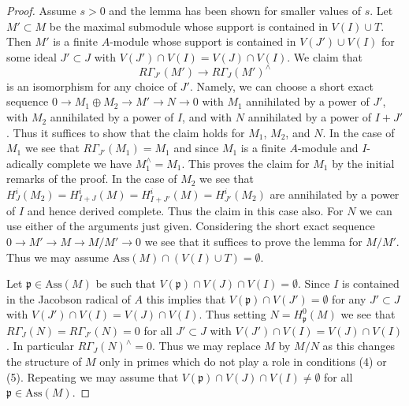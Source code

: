 \begin{proof}
\medskip\noindent
Assume $s > 0$ and the lemma has been shown for smaller values of $s$.
Let $M' \subset M$ be the maximal submodule whose support is contained
in $V(I) \cup T$. Then $M'$ is a finite $A$-module whose support
is contained in $V(J') \cup V(I)$ for some ideal $J' \subset J$
with $V(J') \cap V(I) = V(J) \cap V(I)$.
We claim that
$$
R\Gamma_{J'}(M') \to R\Gamma_J(M')^\wedge
$$
is an isomorphism for any choice of $J'$.
Namely, we can choose a short exact sequence
$0 \to M_1 \oplus M_2 \to M' \to N \to 0$ with
$M_1$ annihilated by a power of $J'$, with $M_2$ annihilated
by a power of $I$, and with $N$ annihilated by a power of $I + J'$.
Thus it suffices to show that the claim holds for $M_1$, $M_2$, and $N$.
In the case of $M_1$ we see that $R\Gamma_{J'}(M_1) = M_1$ and
since $M_1$ is a finite $A$-module and $I$-adically complete
we have $M_1^\wedge = M_1$. This proves the claim for $M_1$
by the initial remarks of the proof. In the case of $M_2$ we see that
$H^i_J(M_2) = H^i_{I + J}(M) = H^i_{I + J'}(M) = H^i_{J'}(M_2)$
are annihilated by a power of $I$ and hence derived complete.
Thus the claim in this case also. For $N$ we can use either of
the arguments just given. Considering the short exact sequence
$0 \to M' \to M \to M/M' \to 0$
we see that it suffices to prove the lemma for $M/M'$.
Thus we may assume $\text{Ass}(M) \cap (V(I) \cup T) = \emptyset$.

\medskip\noindent
Let $\mathfrak p \in \text{Ass}(M)$ be such that
$V(\mathfrak p) \cap V(J) \cap V(I) = \emptyset$.
Since $I$ is contained in the Jacobson radical of $A$ this implies
that $V(\mathfrak p) \cap V(J') = \emptyset$ for any
$J' \subset J$ with $V(J') \cap V(I) = V(J) \cap V(I)$.
Thus setting $N = H^0_\mathfrak p(M)$ we see that
$R\Gamma_J(N) = R\Gamma_{J'}(N) = 0$ for all
$J' \subset J$ with $V(J') \cap V(I) = V(J) \cap V(I)$.
In particular $R\Gamma_J(N)^\wedge = 0$.
Thus we may replace $M$ by $M/N$ as this changes the
structure of $M$ only in primes which do not play
a role in conditions (4) or (5). Repeating we may assume that
$V(\mathfrak p) \cap V(J) \cap V(I) \not = \emptyset$
for all $\mathfrak p \in \text{Ass}(M)$.


\end{proof}
